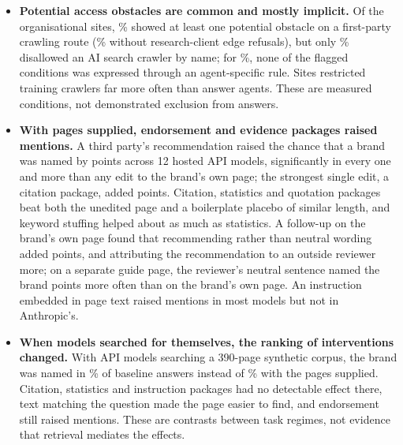 \begin{itemize}
  \item \textbf{Potential access obstacles are common and mostly implicit.} Of the organisational sites, \BarAny\% showed
  at least one potential obstacle on a first-party crawling route (\BarNoEdge\% without research-client edge refusals),
  but only \BarNamed\% disallowed an AI search crawler by name; for \BarImplicitOnly\%, none of the flagged conditions
  was expressed through an agent-specific rule. Sites restricted training crawlers far more often than answer agents.
  These are measured conditions, not demonstrated exclusion from answers.
  \item \textbf{With pages supplied, endorsement and evidence packages raised mentions.} A third party's recommendation raised the chance that a brand was named by \EMenAllThirdPartyU{}
  points across 12 hosted API models, significantly in every one and more than any edit to the brand's own page; the
  strongest single edit, a citation package, added \HTwoBestEffectU{} points. Citation, statistics and quotation packages beat
  both the unedited page and a boilerplate placebo of similar length, and keyword stuffing helped about as much as
  statistics. A follow-up on the brand's own page found that recommending rather than neutral wording added \AttrRecU{}
  points, and attributing the recommendation to an outside reviewer \AttrExtU{} more; on a separate guide page, the
  reviewer's neutral sentence named the brand \SiteNeuU{} points more often than on the brand's own page. An instruction
  embedded in page
  text raised mentions in most models but not in Anthropic's.
  \item \textbf{When models searched for themselves, the ranking of interventions changed.} With \AgNModelsW{} API
  models searching a 390-page synthetic corpus, the brand was named in \AgBaseMen\% of baseline answers instead of
  \AgBaseMenCtx\% with the pages supplied. Citation, statistics and instruction packages had no detectable effect there,
  text matching the question made the page easier to find, and endorsement still raised mentions. These are contrasts
  between task regimes, not evidence that retrieval mediates the effects.
\end{itemize}
